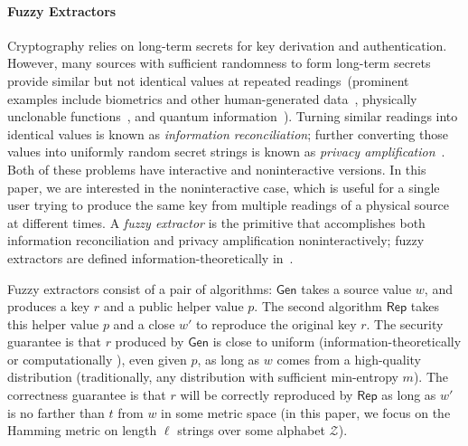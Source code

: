 \documentclass[11pt]{article}
\newcommand{\class}[1]{{\ensuremath{\mathsf{#1}}}}
\newcommand{\gen}{\ensuremath{\class{Gen}}\xspace}
\newcommand{\rep}{\ensuremath{\class{Rep}}\xspace}
\begin{document}
\paragraph{Fuzzy Extractors}
Cryptography relies on long-term secrets for key derivation and authentication. However, many sources with sufficient randomness to form long-term secrets provide similar but not identical values at repeated readings~(prominent examples include biometrics and other human-generated data~\cite{daugman2004,zviran1993comparison,brostoff2000passfaces,ellison2000protecting,mayrhofer2009shake,monrose2002password},
physically unclonable functions~\cite{pappu2002physical,tuyls2006puf,gassend2002silicon,suh2007physical},
and quantum information~\cite{bennett1988privacy}). Turning similar readings into identical values is known as \emph{information reconciliation}; further converting those values into uniformly random secret strings is known as \emph{privacy amplification}~\cite{bennett1988privacy}.
Both of these problems have interactive and noninteractive versions.  In this paper, we are interested in the noninteractive case, which is useful for a single user trying to produce the same key from multiple readings of a physical source at different times.
 A \emph{fuzzy extractor} is the primitive that accomplishes both information reconciliation and privacy amplification noninteractively; fuzzy extractors are defined information-theoretically in~\cite{DBLP:journals/siamcomp/DodisORS08}.


Fuzzy extractors consist of a pair of algorithms: \gen takes a source value $w$, and produces a key $r$ and a public helper value $p$.  The second algorithm \rep takes this helper value $p$ and a close $w'$ to reproduce the original key $r$.  The security guarantee is that $r$ produced by \gen is close to uniform (information-theoretically \cite{DBLP:journals/siamcomp/DodisORS08} or computationally \cite{fuller2013computational}), even given $p$, as long as $w$ comes from a high-quality distribution (traditionally, any distribution with sufficient min-entropy $m$). The correctness guarantee is that $r$ will be correctly reproduced by \rep as long as $w'$ is no farther than $t$ from $w$ in some metric space (in this paper, we focus on the Hamming metric on length $\ell$ strings over some alphabet $\mathcal{Z}$).
\end{document}
